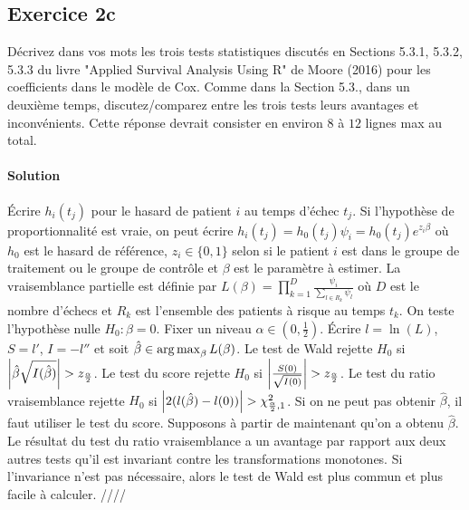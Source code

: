 \documentclass[../main.tex]{subfiles}
\begin{document}
\begin{CJK*}{UTF8}{gbsn}
\section*{Exercice 2c}

Décrivez dans vos mots les trois tests statistiques discutés en Sections 5.3.1, 5.3.2,
5.3.3 du livre "Applied Survival Analysis Using R" de Moore (2016) pour les coefficients dans le modèle de Cox. 
Comme dans la Section 5.3., dans un deuxième temps, discutez/comparez entre les trois tests leurs avantages et
inconvénients. Cette réponse devrait consister en environ $8$ à $12$ lignes max au total.

\smallskip
\paragraph{Solution}

Écrire $h_i(t_j)$ pour le hasard de patient $i$ au temps d'échec $t_j$.
Si l'hypothèse de proportionnalité est vraie,
on peut écrire $h_i(t_j) = h_0(t_j) \psi_i = h_0(t_j) e^{z_i \beta}$
où $h_0$ est le hasard de référence, $z_i \in \{0, 1\}$ selon 
si le patient $i$ est dans le groupe de traitement ou le groupe de contrôle
et $\beta$ est le paramètre à estimer. 
La vraisemblance partielle est définie par 
$L(\beta) = \prod_{k=1}^D \frac{\psi_i}{\sum_{l \in R_k} \psi_l} $
où $D$ est le nombre d'échecs et $R_k$ est l'ensemble des patients à risque au temps $t_k$.
On teste l'hypothèse nulle $H_0 : \beta = 0$.
Fixer un niveau $\alpha \in (0, \frac{1}{2})$.
Écrire $l = \ln (L)$, $S = l'$, $I = - l''$ et soit $\hat{\beta} \in \operatorname*{arg\,max}_{\beta} L(\beta)$.
Le test de Wald rejette $H_0$ si $\abs{\hat{\beta} \sqrt{I(\hat{\beta})} } > z_{\frac{\alpha}{2}}$.
Le test du score rejette $H_0$ si $\abs{\frac{S(0)}{\sqrt{I(0)}}} > z_{\frac{\alpha}{2}}$.
Le test du ratio vraisemblance rejette $H_0$ si $\abs{2(l(\hat{\beta})-l(0))} > \chi^2_{\frac{\alpha}{2},1}$.
Si on ne peut pas obtenir $\hat{\beta}$, il faut utiliser le test du score.
Supposons à partir de maintenant qu'on a obtenu $\hat{\beta}$.
Le résultat du test du ratio vraisemblance a un avantage par rapport aux deux autres tests
qu'il est invariant contre les transformations monotones.
Si l'invariance n'est pas nécessaire, 
alors le test de Wald est plus commun et plus facile à calculer. ////

\end{CJK*}
\end{document}
